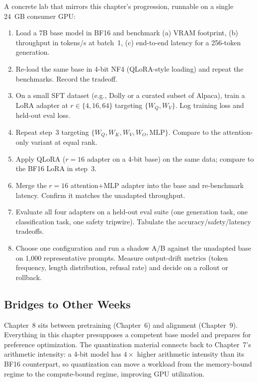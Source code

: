A concrete lab that mirrors this chapter's progression, runnable on
a single 24~GB consumer GPU:

\begin{enumerate}
  \item Load a 7B base model in BF16 and benchmark (a) VRAM
        footprint, (b) throughput in tokens/s at batch~1, (c)
        end-to-end latency for a 256-token generation.
  \item Re-load the same base in 4-bit NF4 (QLoRA-style loading)
        and repeat the benchmarks. Record the tradeoff.
  \item On a small SFT dataset (e.g., Dolly or a curated subset of
        Alpaca), train a LoRA adapter at $r\in\{4, 16, 64\}$
        targeting $\{W_Q, W_V\}$. Log training loss and held-out
        eval loss.
  \item Repeat step~3 targeting $\{W_Q, W_K, W_V, W_O, \text{MLP}\}$.
        Compare to the attention-only variant at equal rank.
  \item Apply QLoRA ($r=16$ adapter on a 4-bit base) on the same
        data; compare to the BF16 LoRA in step~3.
  \item Merge the $r=16$ attention+MLP adapter into the base and
        re-benchmark latency. Confirm it matches the unadapted
        throughput.
  \item Evaluate all four adapters on a held-out eval suite (one
        generation task, one classification task, one safety
        tripwire). Tabulate the accuracy/safety/latency tradeoffs.
  \item Choose one configuration and run a shadow A/B against the
        unadapted base on 1,000 representative prompts. Measure
        output-drift metrics (token frequency, length distribution,
        refusal rate) and decide on a rollout or rollback.
\end{enumerate}

\subsection{Bridges to Other Weeks}

Chapter~8 sits between pretraining (Chapter~6) and alignment (Chapter~9).
Everything in this chapter presupposes a competent base model and
prepares for preference optimization. The quantization material
connects back to Chapter~7's arithmetic intensity: a 4-bit model has
$4\times$ higher arithmetic intensity than its BF16 counterpart, so
quantization can move a workload from the memory-bound regime to
the compute-bound regime, improving GPU utilization.

